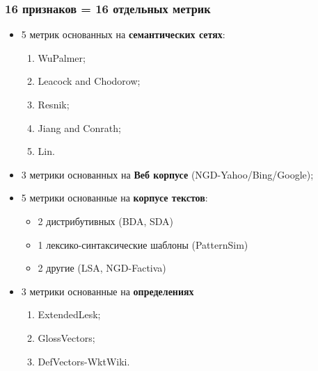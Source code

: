 \documentclass{beamer}
\begin{document}







\begin{frame}
\frametitle{16 признаков = 16 отдельных метрик}

	\begin{itemize}
	
	\item 5 метрик основанных на \textbf{семантических сетях}:
	\begin{enumerate}
	  \item WuPalmer;
	  \item Leacock and Chodorow;
	  \item Resnik;
	  \item Jiang and Conrath;
	  \item Lin.
	\end{enumerate} 
	\item 3 метрики основанных на \textbf{Веб корпусе} (NGD-Yahoo/Bing/Google);
		
	\item 5 метрики основанные на \textbf{корпусе текстов}: 
	\begin{itemize}
	  \item 2 дистрибутивных (BDA, SDA)
	  \item 1 лексико-синтаксические шаблоны (PatternSim)
	  \item 2 другие (LSA, NGD-Factiva)
	\end{itemize}
	
	\item 3 метрики основанные на \textbf{определениях} 
	\begin{enumerate}
	  \item ExtendedLesk;
	  \item GlossVectors;
	  \item DefVectors-WktWiki.
	\end{enumerate}
	 
\end{itemize}

\end{frame}
\end{document}
